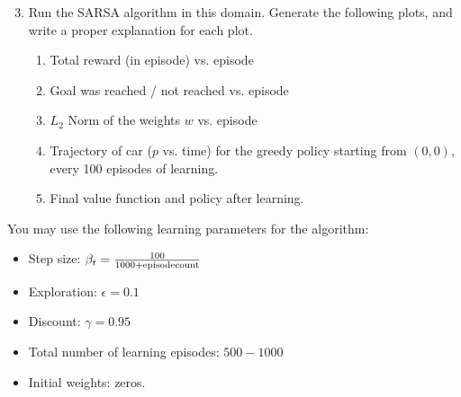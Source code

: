 \begin{exercise}
\begin{enumerate}
\setcounter{enumi}{2}
  \item Run the SARSA algorithm in this domain. Generate the following plots, and write a proper explanation for each plot.
  \begin{enumerate}
    \item Total reward (in episode) vs. episode
    \item Goal was reached / not reached vs. episode
    \item ${L_2}$ Norm of the weights $w$ vs. episode
    \item Trajectory of car ($p$ vs. time) for the greedy policy starting from $\left( {0,0} \right)$, every 100 episodes of learning.
    \item Final value function and policy after learning.
  \end{enumerate}
\end{enumerate}

You may use the following learning parameters for the algorithm:
\begin{itemize}
  \item Step size: ${\beta _t} = \frac{{100}}{{1000 + {\rm{episode count}}}}$
  \item Exploration: $\epsilon = 0.1$
  \item Discount: $\gamma  = 0.95$
  \item Total number of learning episodes: $500 - 1000$
  \item Initial weights: zeros.
\end{itemize}


\end{exercise}
